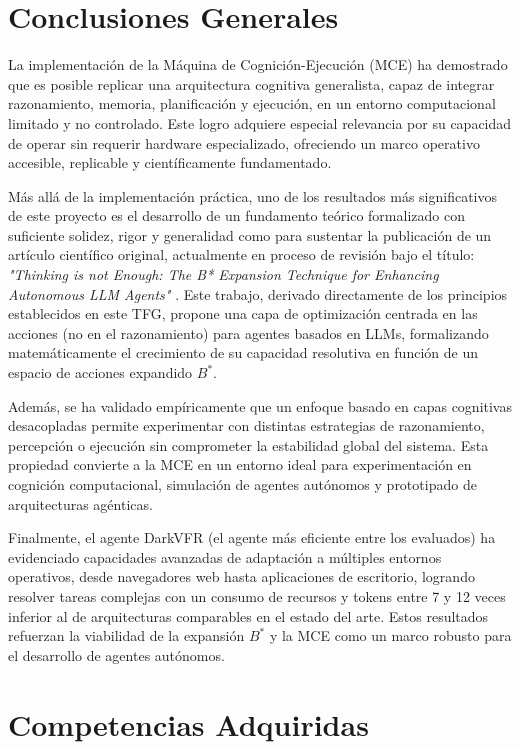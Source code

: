 \section{Conclusiones Generales}

La implementación de la Máquina de Cognición-Ejecución (MCE) ha demostrado que
es posible replicar una arquitectura cognitiva generalista, capaz de integrar
razonamiento, memoria, planificación y ejecución, en un entorno computacional
limitado y no controlado. Este logro adquiere especial relevancia por su
capacidad de operar sin requerir hardware especializado, ofreciendo un marco
operativo accesible, replicable y científicamente fundamentado.

Más allá de la implementación práctica, uno de los resultados más significativos
de este proyecto es el desarrollo de un fundamento teórico formalizado
con suficiente solidez, rigor y generalidad como para sustentar la publicación
de un artículo científico original, actualmente en proceso de revisión bajo el
título: \textit{"Thinking is not Enough: The B* Expansion Technique for
Enhancing Autonomous LLM Agents"} \citet{bstar-expansion-2025}. Este trabajo, 
derivado directamente de los
principios establecidos en este TFG, propone una capa de optimización centrada
en las acciones (no en el razonamiento) para agentes basados en LLMs,
formalizando matemáticamente el crecimiento de su capacidad resolutiva en
función de un espacio de acciones expandido $B^*$.

Además, se ha validado empíricamente que un enfoque basado en capas cognitivas
desacopladas permite experimentar con distintas estrategias de razonamiento,
percepción o ejecución sin comprometer la estabilidad global del sistema. Esta
propiedad convierte a la MCE en un entorno ideal para experimentación en
cognición computacional, simulación de agentes autónomos y prototipado de
arquitecturas agénticas.

Finalmente, el agente DarkVFR (el agente más eficiente entre los evaluados) ha
evidenciado capacidades avanzadas de adaptación a múltiples entornos operativos,
desde navegadores web hasta aplicaciones de escritorio, logrando resolver tareas
complejas con un consumo de recursos y tokens entre 7 y 12 veces inferior al de
arquitecturas comparables en el estado del arte. Estos resultados refuerzan la
viabilidad de la expansión $B^*$ y la MCE como un marco robusto para el
desarrollo de agentes autónomos.

\section{Competencias Adquiridas}

